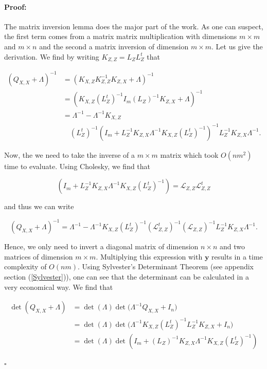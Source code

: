 \documentclass[12pt,a4paper,oneside]{book}
\newenvironment{proof}{\paragraph{Proof:}}{\hfill$\square$}
\begin{document}
\begin{proof}
The matrix inversion lemma does the major part of the work. As one can suspect, the first term comes from a matrix matrix multiplication with dimensions $m \times m$ and $m \times n$ and the second a matrix inversion of dimension $m \times m$.  Let us give the derivation. We find by  writing $K_{Z,Z} = L_{Z}  L_{Z}^t$ that 

\begin{equation}
\begin{aligned}
(Q_{X,X} + \Lambda) ^{-1} &= (K_{X,Z} K_{Z,Z}^{-1} K_{Z,X} + \Lambda)^{-1}  \\
&= (K_{X,Z}  (L_{Z}^t)^{-1} I_m (L_{Z})^{-1} K_{Z,X} + \Lambda)^{-1}  \\
&= \Lambda^{-1} - \Lambda^{-1} K_{X,Z} \\ 
& \quad (L_{Z}^t)^{-1} ( I_m + L_{Z}^{-1} K_{Z,X} \Lambda^{-1} K_{X,Z} (L_{Z}^t)^{-1} )^{-1} L_{Z}^{-1} K_{Z,X} \Lambda^{-1}.
\end{aligned}
\end{equation}

Now, the we need to take the inverse of a $m \times m$ matrix which took $O(nm^2)$ time to evaluate. Using Cholesky, we find that 

\begin{equation}\label{Sparse_efficient_cal}
( I_m + L_{Z}^{-1} K_{Z,X} \Lambda^{-1} K_{X,Z} (L_{Z}^t)^{-1} ) = \mathcal{L}_{Z,Z} \mathcal{L}_{Z,Z}^t
\end{equation}

and thus we can write 

\begin{equation}
(Q_{X,X} + \Lambda) ^{-1} =  \Lambda^{-1} - \Lambda^{-1} K_{X,Z}(L_{Z}^t)^{-1} (\mathcal{L}_{Z,Z}^t)^{-1} (\mathcal{L}_{Z,Z})^{-1}  L_{Z}^{-1} K_{Z,X} \Lambda^{-1}.
\end{equation}

Hence, we only need to invert a diagonal matrix of dimension $n \times n$ and two matrices of dimension $m \times m$. Multiplying this expression with $\bm{y}$ results in a time complexity of $O(nm)$. Using Sylvester’s Determinant Theorem (see appendix section (\ref{Sylvester})), one can see that the determinant can be calculated in a very economical way. We find that

\begin{equation}
\begin{aligned}
\det{(Q_{X,X} + \Lambda)} &= \det{(\Lambda)} \det({\Lambda^{-1} Q_{X,X} + I_n)} \\
&=  \det{(\Lambda)} \det{(\Lambda^{-1} K_{X,Z}} (L_{Z} ^t)^{-1} L_{Z}^{-1}  K_{Z,X} + I_{n}) \\
&= \det{(\Lambda)}  \det{( I_{m} + (L_{Z}) ^{-1} K_{Z,X} \Lambda^{-1} K_{X,Z} (L_{Z}^t)^{-1} ) }
\end{aligned}
\end{equation}


\end{proof}
\end{document}
